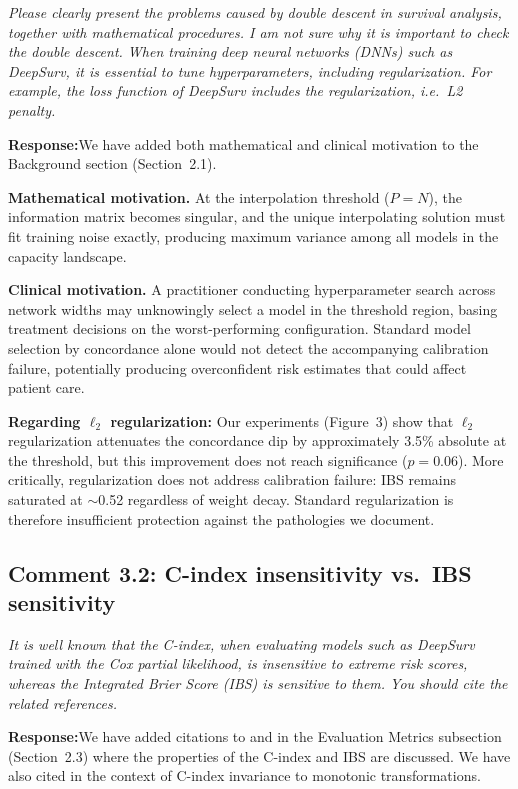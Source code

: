 \documentclass[12pt,a4paper]{article}
\newcommand{\comment}[1]{%
  \begin{reviewerbox}
    \textit{#1}
  \end{reviewerbox}
}
\newcommand{\response}{\noindent\textbf{Response:}\quad}
\begin{document}
\comment{Please clearly present the problems caused by double descent in survival analysis, together with mathematical procedures. I am not sure why it is important to check the double descent. When training deep neural networks (DNNs) such as DeepSurv, it is essential to tune hyperparameters, including regularization. For example, the loss function of DeepSurv includes the regularization, i.e.\ L2 penalty.}

\response We have added both mathematical and clinical motivation to the
Background section (Section~2.1).

\textbf{Mathematical motivation.} At the interpolation threshold ($P = N$),
the information matrix becomes singular, and the unique interpolating
solution must fit training noise exactly, producing maximum variance among
all models in the capacity landscape.

\textbf{Clinical motivation.} A practitioner conducting hyperparameter search
across network widths may unknowingly select a model in the threshold
region, basing treatment decisions on the worst-performing configuration.
Standard model selection by concordance alone would not detect the
accompanying calibration failure, potentially producing overconfident risk
estimates that could affect patient care.

\textbf{Regarding $\ell_2$ regularization:} Our experiments (Figure~3) show
that $\ell_2$ regularization attenuates the concordance dip by approximately
3.5\% absolute at the threshold, but this improvement does not reach
significance ($p = 0.06$). More critically, regularization does not address
calibration failure: IBS remains saturated at $\sim$0.52 regardless of weight
decay. Standard regularization is therefore insufficient protection against
the pathologies we document.


\bigskip

\subsection*{Comment 3.2: C-index insensitivity vs.\ IBS sensitivity}

\comment{It is well known that the C-index, when evaluating models such as DeepSurv trained with the Cox partial likelihood, is insensitive to extreme risk scores, whereas the Integrated Brier Score (IBS) is sensitive to them. You should cite the related references.}

\response We have added citations to \citet{uno2011c} and
\citet{austin2020graphical} in the Evaluation Metrics subsection
(Section~2.3) where the properties of the C-index and IBS are discussed. We
have also cited \citet{hartman2023pitfalls} in the context of C-index
invariance to monotonic transformations.
\end{document}
